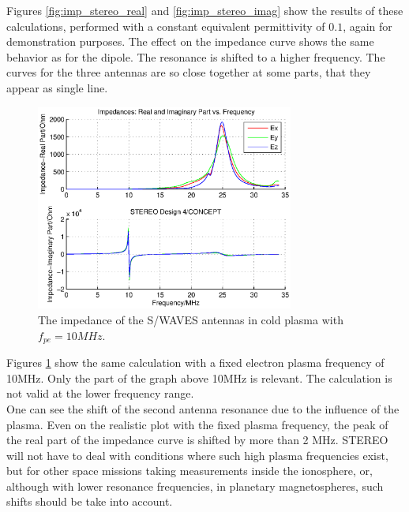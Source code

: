 \documentclass[two-coloumn,ras]{agutex}
\begin{document}
\begin{article}
Figures \ref{fig:imp_stereo_real} and \ref{fig:imp_stereo_imag} show the results of these calculations, performed with a constant equivalent permittivity of $0.1$, again for demonstration purposes. The effect on the impedance curve shows the same behavior as for the dipole. The resonance is shifted to a higher frequency. The curves for the three antennas are so close together at some parts, that they appear as single line.\\

\begin{figure}
\noindent\includegraphics[width=20pc]{impedance_stereo_pl_fix.eps}
  \caption{The impedance of the S/WAVES antennas in cold plasma with $f_{pe}=10MHz$.}\label{fig:imp_stereo_fix}
\end{figure}

Figures \ref{fig:imp_stereo_fix} show the same calculation with a fixed electron plasma frequency of 10MHz. Only the part of the graph above 10MHz is relevant. The calculation is not valid at the lower frequency range.\\

One can see the shift of the second antenna resonance due to the influence of the plasma. Even on the realistic plot with the fixed plasma frequency, the peak of the real part of the impedance curve is shifted by more than 2 MHz. STEREO will not have to deal with conditions where such high plasma frequencies exist, but for other space missions taking measurements inside the ionosphere, or, although with lower resonance frequencies, in planetary magnetospheres, such shifts should be take into account.\\


\end{article}
\end{document}
